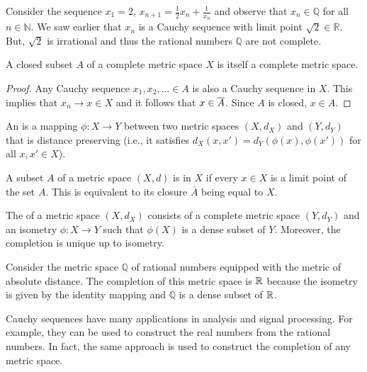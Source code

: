\begin{example}
Consider the sequence $x_1 = 2$, $x_{n+1} = \frac{1}{2}x_n + \frac{1}{x_n}$ and observe that $x_n \in \mathbb{Q}$ for all $n\in \mathbb{N}$.
We saw earlier that $x_n$ is a Cauchy sequence with limit point $\sqrt{2} \in \mathbb{R}$.
But, $\sqrt{2}$ is irrational and thus the rational numbers $\mathbb{Q}$ are not complete.
\end{example}

\begin{theorem}
A closed subset $A$ of a complete metric space $X$ is itself a complete metric space.
\end{theorem}
\begin{proof}
Any Cauchy sequence $x_1,x_2,\ldots \in A$ is also a Cauchy sequence in $X$.
This implies that $x_n \to x \in X$ and it follows that $x \in \overline{A}$.
Since $A$ is closed, $x\in A$.
\end{proof}

\begin{definition}
An  is a mapping $\phi  \colon X \rightarrow Y$ between two metric spaces $(X,d_X)$ and $(Y,d_Y)$ that is distance preserving (i.e., it satisfies $d_X (x,x') = d_Y \left(\phi(x),\phi(x')\right)$ for all $x,x'\in X$).
\end{definition}

\begin{definition}
A subset $A$ of a metric space $(X,d)$ is  in $X$ if every $x\in X$ is a limit point of the set $A$.
This is equivalent to its closure $\overline{A}$ being equal to $X$.
\end{definition}

\begin{definition}
The  of a metric space $(X,d_X)$ consists of a complete metric space $(Y,d_Y)$ and an isometry $\phi  \colon X \rightarrow Y$ such that $\phi(X)$ is a dense subset of $Y$.
Moreover, the completion is unique up to isometry.
\end{definition}

\begin{example}
Consider the metric space $\mathbb{Q}$ of rational numbers equipped with the metric of absolute distance.
The completion of this metric space is $\mathbb{R}$ because the isometry is given by the identity mapping and $\mathbb{Q}$ is a dense subset of $\mathbb{R}$.
\end{example}

Cauchy sequences have many applications in analysis and signal processing.
For example, they can be used to construct the real numbers from the rational numbers.
In fact, the same approach is used to construct the completion of any metric space.

